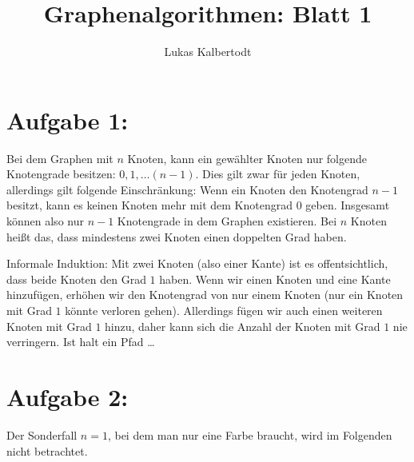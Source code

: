 \documentclass[11pt]{scrartcl}  %
\title{Graphenalgorithmen: Blatt 1}
\author{Lukas Kalbertodt}
\newcommand{\subtbegin}{\begin{compactenum}[(a)]}
\newcommand{\subtend}{\end{compactenum}}
\begin{document}
\maketitle


\section*{Aufgabe 1:}

\subtbegin
  \item Bei dem Graphen mit $n$ Knoten, kann ein gewählter Knoten nur folgende Knotengrade besitzen: $0, 1, \dots (n-1)$. Dies gilt zwar für jeden Knoten, allerdings gilt folgende Einschränkung: Wenn ein Knoten den Knotengrad $n-1$ besitzt, kann es keinen Knoten mehr mit dem Knotengrad $0$ geben. Insgesamt können also nur $n-1$ Knotengrade in dem Graphen existieren. Bei $n$ Knoten heißt das, dass mindestens zwei Knoten einen doppelten Grad haben.
  \item Informale Induktion: Mit zwei Knoten (also einer Kante) ist es offentsichtlich, dass beide Knoten den Grad $1$ haben. Wenn wir einen Knoten und eine Kante hinzufügen, erhöhen wir den Knotengrad von nur einem Knoten (nur ein Knoten mit Grad $1$ könnte verloren gehen). Allerdings fügen wir auch einen weiteren Knoten mit Grad $1$ hinzu, daher kann sich die Anzahl der Knoten mit Grad $1$ nie verringern. Ist halt ein Pfad \dots
\subtend

\section*{Aufgabe 2:}

Der Sonderfall $n=1$, bei dem man nur eine Farbe braucht, wird im Folgenden nicht betrachtet.
\end{document}
